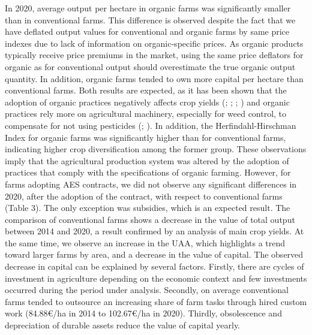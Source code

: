 \begin{Article}
\begin{refsection}[Lassalas]
In 2020, average output per hectare in organic farms was significantly
smaller than in conventional farms. This difference is observed despite
the fact that we have deflated output values for conventional and
organic farms by same price indexes due to lack of information on
organic-specific prices. As organic products typically receive price
premiums in the market, using the same price deflators for organic as
for conventional output should overestimate the true organic output
quantity. In addition, organic farms tended to own more capital per
hectare than conventional farms. Both results are expected, as it has
been shown that the adoption of organic practices negatively affects
crop yields (\textcite{de_ponti_rijk_van_ittersum_2012}; \textcite{seufert_ramankutty_foley_2012}; \textcite{reganold_wachter_2016}; \textcite{smith_etal_2020}) and organic practices rely more on agricultural machinery,
especially for weed control, to compensate for not using pesticides
(\textcite{turner_etal_2007}; \textcite{benaragama2013}).
In addition, the Herfindahl-Hirschman Index for organic farms was
significantly higher than for conventional farms, indicating higher crop
diversification among the former group. These observations imply that
the agricultural production system was altered by the adoption of
practices that comply with the specifications of organic farming.
However, for farms adopting AES contracts, we did not observe any
significant differences in 2020, after the adoption of the contract,
with respect to conventional farms (Table 3). The only exception was
subsidies, which is an expected result. The comparison of conventional farms shows a decrease in the value of
total output between 2014 and 2020, a result confirmed by an analysis of
main crop yields. At the same time, we observe an increase in the UAA,
which highlights a trend toward larger farms by area, and a decrease in
the value of capital. The observed decrease in capital can be explained
by several factors. Firstly, there are cycles of investment in
agriculture depending on the economic context and few investments
occurred during the period under analysis. Secondly, on average
conventional farms tended to outsource an increasing share of farm tasks
through hired custom work (84.88€/ha in 2014 to 102.67€/ha in 2020).
Thirdly, obsolescence and depreciation of durable assets reduce the
value of capital yearly.

\begin{center}
    \label{TableDesc2020}
    \tabcolsep=3pt
\end{center}
\end{refsection}
\end{Article}
